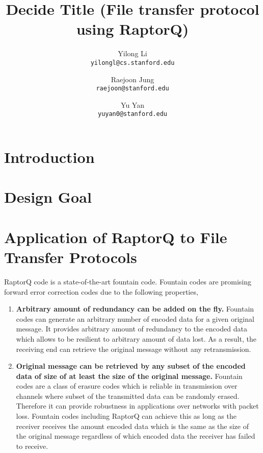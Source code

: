 \documentclass{sig-alternate-10pt}
\begin{document}
\title{Decide Title (File transfer protocol using RaptorQ)}
\author{
  Yilong Li\\
  \texttt{yilongl@cs.stanford.edu}
  \and 
  Raejoon Jung\\
  \texttt{raejoon@stanford.edu}
  \and
  Yu Yan\\
  \texttt{yuyan0@stanford.edu}
}

\maketitle
\section{Introduction}

\section{Design Goal}

\section{Application of RaptorQ to File Transfer Protocols}
RaptorQ code is a state-of-the-art fountain code. Fountain codes are promising
forward error correction codes due to the following properties,
\begin{enumerate}[label=(\alph*)]
  \item \textbf{Arbitrary amount of redundancy can be added on the fly.}
  Fountain codes can generate an arbitrary number of encoded data for a given
  original message. It provides arbitrary amount of redundancy to the encoded
  data which allows to be resilient to arbitrary amount of data lost. As a
  result, the receiving end can retrieve the original message without any
  retransmission.

  \item \textbf{Original message can be retrieved by any subset of the encoded
  data of size of at least the size of the original message.} 
  Fountain codes are a class of erasure codes which is reliable in transmission
  over channels where subset of the transmitted data can be randomly erased.
  Therefore it can provide robustness in applications over networks with packet
  loss. Fountain codes including RaptorQ can achieve this as long as the
  receiver receives the amount encoded data which is the same as the size of the
  original message regardless of which encoded data the receiver has failed to
  receive.   
\end{enumerate}
\end{document}
